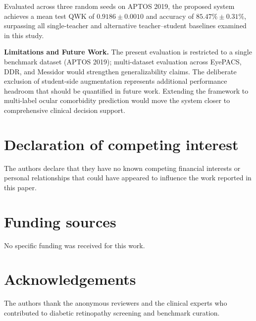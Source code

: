 \documentclass[a4paper,fleqn]{cas-dc}
\begin{document}
Evaluated across three random seeds on APTOS 2019, the proposed system achieves a mean test QWK of $\mathbf{0.9186 \pm 0.0010}$ and accuracy of $\mathbf{85.47\% \pm 0.31\%}$, surpassing all single-teacher and alternative teacher--student baselines examined in this study.

\textbf{Limitations and Future Work.} The present evaluation is restricted to a single benchmark dataset (APTOS 2019); multi-dataset evaluation across EyePACS, DDR, and Messidor would strengthen generalizability claims. The deliberate exclusion of student-side augmentation represents additional performance headroom that should be quantified in future work. Extending the framework to multi-label ocular comorbidity prediction would move the system closer to comprehensive clinical decision support.

\section*{Declaration of competing interest}
The authors declare that they have no known competing financial interests or personal relationships that could have appeared to influence the work reported in this paper.

\section*{Funding sources}
No specific funding was received for this work.

\section*{Acknowledgements}
The authors thank the anonymous reviewers and the clinical experts who contributed to diabetic retinopathy screening and benchmark curation.


\end{document}
